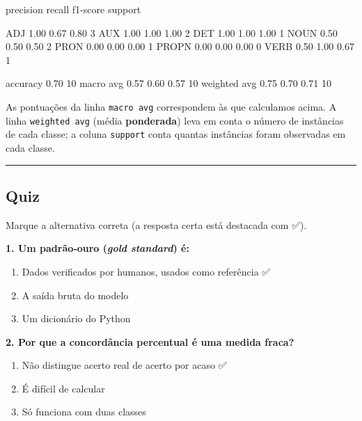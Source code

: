\documentclass[
  brazilian,
  11pt,
]{article}
\newenvironment{Shaded}{\begin{snugshade}}{\end{snugshade}}
\newcommand{\NormalTok}[1]{\textcolor[rgb]{0.81,0.81,0.76}{#1}}
\providecommand{\tightlist}{%
  \setlength{\itemsep}{0pt}\setlength{\parskip}{0pt}}
\let\oldtexttt\texttt
\renewcommand{\texttt}[1]{{\color{inlink}\oldtexttt{#1}}}
\begin{document}
\begin{Shaded}
\begin{Highlighting}[]
\NormalTok{              precision    recall  f1{-}score   support}

\NormalTok{         ADJ       1.00      0.67      0.80         3}
\NormalTok{         AUX       1.00      1.00      1.00         2}
\NormalTok{         DET       1.00      1.00      1.00         1}
\NormalTok{        NOUN       0.50      0.50      0.50         2}
\NormalTok{        PRON       0.00      0.00      0.00         1}
\NormalTok{       PROPN       0.00      0.00      0.00         0}
\NormalTok{        VERB       0.50      1.00      0.67         1}

\NormalTok{    accuracy                           0.70        10}
\NormalTok{   macro avg       0.57      0.60      0.57        10}
\NormalTok{weighted avg       0.75      0.70      0.71        10}
\end{Highlighting}
\end{Shaded}

As pontuações da linha \texttt{macro\ avg} correspondem às que
calculamos acima. A linha \texttt{weighted\ avg} (média
\textbf{ponderada}) leva em conta o número de instâncias de cada classe;
a coluna \texttt{support} conta quantas instâncias foram observadas em
cada classe.

\begin{center}\rule{0.5\linewidth}{0.5pt}\end{center}

\subsection{Quiz}\label{quiz}

Marque a alternativa correta (a resposta certa está destacada com ✅).

\textbf{1. Um padrão‑ouro (\emph{gold standard}) é:}

\begin{enumerate}
\def\labelenumi{\arabic{enumi}.}
\tightlist
\item
  Dados verificados por humanos, usados como referência ✅
\item
  A saída bruta do modelo
\item
  Um dicionário do Python
\end{enumerate}

\textbf{2. Por que a concordância percentual é uma medida fraca?}

\begin{enumerate}
\def\labelenumi{\arabic{enumi}.}
\tightlist
\item
  Não distingue acerto real de acerto por acaso ✅
\item
  É difícil de calcular
\item
  Só funciona com duas classes
\end{enumerate}
\end{document}
